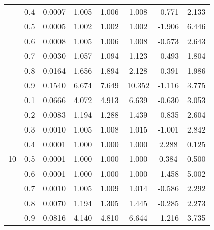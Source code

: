 \documentclass[11pt,a4paper]{report}
\begin{document}
\begin{longtable}{ | c | c || c | c | c | c | c | c | }
 & 0.4 & 0.0007 & 1.005 & 1.006 & 1.008 & -0.771 & 2.133 \\
 & 0.5 & 0.0005 & 1.002 & 1.002 & 1.002 & -1.906 & 6.446 \\
 & 0.6 & 0.0008 & 1.005 & 1.006 & 1.008 & -0.573 & 2.643 \\
 & 0.7 & 0.0030 & 1.057 & 1.094 & 1.123 & -0.493 & 1.804 \\
 & 0.8 & 0.0164 & 1.656 & 1.894 & 2.128 & -0.391 & 1.986 \\
 & 0.9 & 0.1540 & 6.674 & 7.649 & 10.352 & -1.116 & 3.775 \\
 \hline
\multirow{9}{*}{10} & 0.1 & 0.0666 & 4.072 & 4.913 & 6.639 & -0.630 & 3.053 \\
 & 0.2 & 0.0083 & 1.194 & 1.288 & 1.439 & -0.835 & 2.604 \\
 & 0.3 & 0.0010 & 1.005 & 1.008 & 1.015 & -1.001 & 2.842 \\
 & 0.4 & 0.0001 & 1.000 & 1.000 & 1.000 & 2.288 & 0.125 \\
 & 0.5 & 0.0001 & 1.000 & 1.000 & 1.000 & 0.384 & 0.500 \\
 & 0.6 & 0.0001 & 1.000 & 1.000 & 1.000 & -1.458 & 5.002 \\
 & 0.7 & 0.0010 & 1.005 & 1.009 & 1.014 & -0.586 & 2.292 \\
 & 0.8 & 0.0070 & 1.194 & 1.305 & 1.445 & -0.285 & 2.273 \\
 & 0.9 & 0.0816 & 4.140 & 4.810 & 6.644 & -1.216 & 3.735 \\
 \hline
\hline
\end{longtable}
\end{document}
